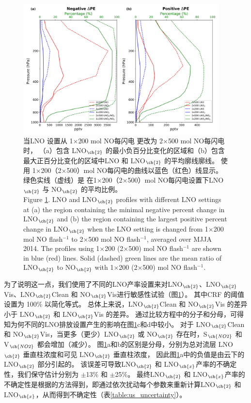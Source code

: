 \begin{figure}[H]
\centering
\includegraphics[width=0.95\textwidth]{./figures/us_lno2_profile.png}
\caption{当LNO 设置从 1$\times$200 mol NO每闪电 更改为 2$\times$500 mol NO每闪电 时，
（a）包含 LNO$_{\ch{2}}$ 的最小负百分比变化的区域和（b）包含最大正百分比变化的区域中LNO 和 LNO$_{\ch{2}}$ 的平均廓线廓线。
使用 1$\times$200（2$\times$500）mol NO每闪电的曲线以蓝色（红色）线显示。
绿色实线（虚线）是 在1$\times$200（2$\times$500）mol NO每闪电设置下LNO$_{\ch{2}}$ 与 NO$_{\ch{2}}$ 的平均比例。\\
Figure \ref{fig:us_lno2_profile}. LNO and LNO$_{\ch{2}}$ profiles with different LNO settings at (a) the region containing the minimal negative percent change in LNO$_{\ch{2}}$ and (b) the region containing the largest positive percent change in LNO$_{\ch{2}}$ when the LNO setting is changed from 1$\times$200 mol NO flash$^{-1}$ to 2$\times$500 mol NO flash$^{-1}$, averaged over MJJA 2014.
The profiles using 1$\times$200 (2$\times$500) mol NO flash$^{-1}$ are shown in blue (red) lines.
Solid (dashed) green lines are the mean ratio of LNO$_{\ch{2}}$ to NO$_{\ch{2}}$ with 1$\times$200 (2$\times$500) mol NO flash$^{-1}$.}
\label{fig:us_lno2_profile}
\end{figure}

为了说明这一点，我们使用了不同的LNO产率设置来对LNO$_{\ch{2}}$、LNO$_{\ch{2}}$Vis、LNO$_{\ch{2}}$Clean 和 NO$_{\ch{2}}$Vis进行敏感性试验（图\ref{fig:us_lno2_profile}）。
其中CRF 的阈值设置为 100\% 以简化等式。
总体上来说，LNO$_{\ch{2}}$Clean 和 NO$_{\ch{2}}$Vis 的差异小于 LNO$_{\ch{2}}$ 和 LNO$_{\ch{2}}$Vis 的差异。
通过比较方程中的分子和分母，可得知为何不同的LNO排放设置产生的影响在图\ref{fig:us_lno2_profile}c和d中较小。
对于 LNO$_{\ch{2}}$Clean 和 NO$_{\ch{2}}$Vis，当更多（更少）LNO$_{\ch{2}}$ 或 NO$_{\ch{2}}$ 存在时，S$_{\ch{NO2}}$ 和 V$_{\ch{NO2}}$ 都会增加（减少）。
图\ref{fig:us_lno2_profile}a和b的区别是分母，分别为总对流层 LNO$_{\ch{2}}$ 垂直柱浓度和可见 LNO$_{\ch{2}}$ 垂直柱浓度，
因此图\ref{fig:us_lno2_profile}a中的负值是由云下的 LNO$_{\ch{2}}$ 部分引起的。
该误差可导致LNO$_{\ch{2}}$ 和 LNO$_{\ch{x}}$产率的不确定性，我们保守估计分别为 $\pm$13\% 和 $\pm$25\%。
最终LNO$_{\ch{2}}$ 和 LNO$_{\ch{x}}$产率的不确定性是根据\citet{Pickering.2016,Allen.2019,Bucsela.2019,Lapierre.2020}的方法得到，即通过依次扰动每个参数来重新计算LNO$_{\ch{2}}$ 和 LNO$_{\ch{x}}$，从而得到不确定性（表\ref{table:us_uncertainty}）。


